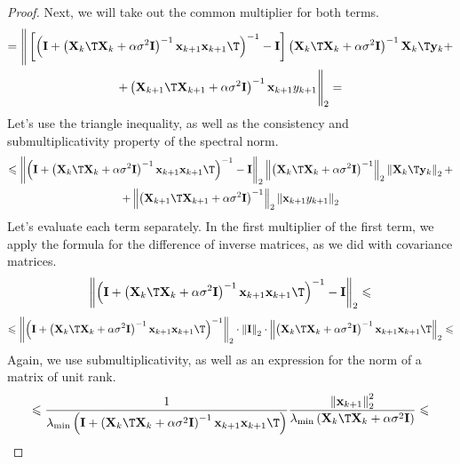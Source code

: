 \documentclass[sn-mathphys-num]{sn-jnl}%
\begin{document}
\begin{appendices}
\begin{proof}
Next, we will take out the common multiplier for both terms.
    \begin{multline*}
        = \Bigg\| \left[ \left( \mathbf{I} + \left( \mathbf{X}_k\T \mathbf{X}_k + \alpha \sigma^2 \mathbf{I} \right)^{-1} \mathbf{x}_{k+1} \mathbf{x}_{k+1}\T \right)^{-1} - \mathbf{I} \right] \left( \mathbf{X}_k\T \mathbf{X}_k + \alpha \sigma^2 \mathbf{I} \right)^{-1} \mathbf{X}_k\T \mathbf{y}_k + \\ + \left( \mathbf{X}_{k+1}\T \mathbf{X}_{k+1} + \alpha \sigma^2 \mathbf{I} \right)^{-1} \mathbf{x}_{k+1} y_{k+1} \Bigg\|_2 =
    \end{multline*}
    Let's use the triangle inequality, as well as the consistency and submultiplicativity property of the spectral norm.
    \begin{multline*}
        \leqslant \left\| \left( \mathbf{I} + \left( \mathbf{X}_k\T \mathbf{X}_k + \alpha \sigma^2 \mathbf{I} \right)^{-1} \mathbf{x}_{k+1} \mathbf{x}_{k+1}\T \right)^{-1} - \mathbf{I} \right\|_2 \left\| \left( \mathbf{X}_k\T \mathbf{X}_k + \alpha \sigma^2 \mathbf{I} \right)^{-1} \right\|_2 \left\| \mathbf{X}_k\T \mathbf{y}_k \right\|_2 + \\ + \left\| \left( \mathbf{X}_{k+1}\T \mathbf{X}_{k+1} + \alpha \sigma^2 \mathbf{I} \right)^{-1} \right\|_2 \left\| \mathbf{x}_{k+1} y_{k+1} \right\|_2
    \end{multline*}
    Let's evaluate each term separately. In the first multiplier of the first term, we apply the formula for the difference of inverse matrices, as we did with covariance matrices.
    \[ \left\| \left( \mathbf{I} + \left( \mathbf{X}_k\T \mathbf{X}_k + \alpha \sigma^2 \mathbf{I} \right)^{-1} \mathbf{x}_{k+1} \mathbf{x}_{k+1}\T \right)^{-1} - \mathbf{I} \right\|_2 \leqslant \]
    \[ \leqslant \left\| \left( \mathbf{I} + \left( \mathbf{X}_k\T \mathbf{X}_k + \alpha \sigma^2 \mathbf{I} \right)^{-1} \mathbf{x}_{k+1} \mathbf{x}_{k+1}\T \right)^{-1} \right\|_2 \cdot \left\| \mathbf{I} \right\|_2 \cdot \left\| \left( \mathbf{X}_k\T \mathbf{X}_k + \alpha \sigma^2 \mathbf{I} \right)^{-1} \mathbf{x}_{k+1} \mathbf{x}_{k+1}\T \right\|_2 \leqslant \]
    Again, we use submultiplicativity, as well as an expression for the norm of a matrix of unit rank.
    \[ \leqslant \dfrac{1}{\lambda_{\min}\left( \mathbf{I} + \left( \mathbf{X}_k\T \mathbf{X}_k + \alpha \sigma^2 \mathbf{I} \right)^{-1} \mathbf{x}_{k+1} \mathbf{x}_{k+1}\T \right)} \dfrac{\left\| \mathbf{x}_{k+1} \right\|_2^2}{\lambda_{\min}\left( \mathbf{X}_k\T \mathbf{X}_k + \alpha \sigma^2 \mathbf{I} \right)} \leqslant \]

\end{proof}
\end{appendices}
\end{document}
